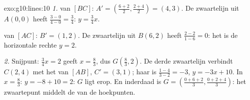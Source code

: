 \begin{solution}{exo:g10:lines:10}
\emph{1.}  van $[BC]$: $A' = \left(\frac{6+2}{2},
\frac{2+4}{2}\right) = (4, 3)$. De zwaartelijn uit $A(0,0)$ heeft
 $\frac{3 - 0}{4 - 0} = \frac34$: 
$y = \frac34 x$.

 van $[AC]$: $B' = (1, 2)$. De zwaartelijn uit $B(6, 2)$ heeft
 $\frac{2 - 2}{1 - 6} = 0$: het is de horizontale rechte
$y = 2$.

\emph{2.} Snijpunt: $\frac34 x = 2$ geeft $x = \frac83$, dus
$G\left(\frac83, 2\right)$. De derde zwaartelijn verbindt $C(2,4)$ met het
 van $[AB]$, $C' = (3, 1)$; haar  is
$\frac{1 - 4}{3 - 2} = -3$,  $y = -3x + 10$. In $x = \frac83$:
$y = -8 + 10 = 2$: $G$ ligt erop. En inderdaad is
$G = \left(\frac{0 + 6 + 2}{3}, \frac{0 + 2 + 4}{3}\right)$: het zwaartepunt
middelt de  van de hoekpunten.
\end{solution}

